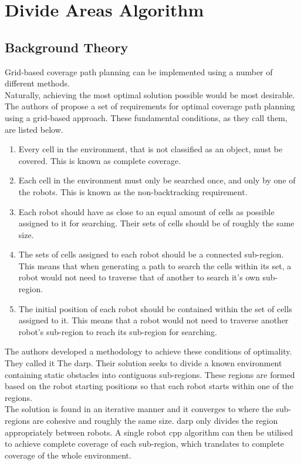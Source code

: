 \chapter{Divide Areas Algorithm}
\label{chp:DARP}

\section{Background Theory}
Grid-based coverage path planning can be implemented using a number of different methods.\\
Naturally, achieving the most optimal solution possible would be most desirable. The authors of \cite{DARP2017} propose a set of requirements for optimal coverage path planning using a grid-based approach. These fundamental conditions, as they call them, are listed below.
\begin{enumerate}
	\item Every cell in the environment, that is not classified as an object, must be covered. This is known as complete coverage.
	\item Each cell in the environment must only be searched once, and only by one of the robots. This is known as the non-backtracking requirement.
	\item Each robot should have as close to an equal amount of cells as possible assigned to it for searching. Their sets of cells should be of roughly the same size.
	\item The sets of cells assigned to each robot should be a connected sub-region. This means that when generating a path to search the cells within its set, a robot would not need to traverse that of another to search it's own sub-region.
	\item The initial position of each robot should be contained within the set of cells assigned to it. This means that a robot would not need to traverse another robot's sub-region to reach its sub-region for searching.
\end{enumerate}
The authors developed a methodology to achieve these conditions of optimality. They called it The \acf{darp}. Their solution seeks to divide a known environment containing static obstacles into contiguous sub-regions. These regions are formed based on the robot starting positions so that each robot starts within one of the regions.\\ 
The solution is found in an iterative manner and it converges to where the sub-regions are cohesive and roughly the same size. \acs{darp} only divides the region appropriately between robots. A single robot \acs{cpp} algorithm can then be utilised to achieve complete coverage of each sub-region, which translates to complete coverage of the whole environment.
